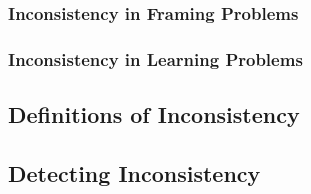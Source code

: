 \documentclass{article}
\begin{document}
	\subsubsection{Inconsistency in Framing Problems}
	\subsubsection{Inconsistency in Learning Problems}
	
	\subsection{Definitions of Inconsistency}
	\subsection{Detecting Inconsistency}
\end{document}

